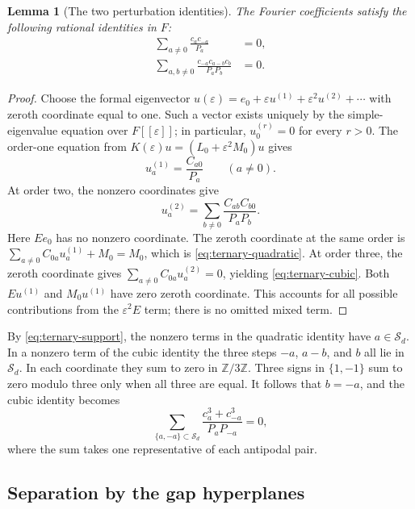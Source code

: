 \documentclass[11pt,a4paper]{article}
\newtheorem{lemma}{Lemma}[section]
\theoremstyle{definition}
\theoremstyle{remark}\newtheorem{remark}[lemma]{Remark}
\newcommand{\Z}{\mathbb Z}\newcommand{\Q}{\mathbb Q}
\begin{document}
\begin{lemma}[The two perturbation identities]\label{lem:ternary-identities}
The Fourier coefficients satisfy the following rational identities in $F$:
\begin{align}
 \sum_{a\ne0}\frac{c_ac_{-a}}{P_a}&=0,
       \label{eq:ternary-quadratic}\\
 \sum_{a,b\ne0}
   \frac{c_{-a}c_{a-b}c_b}{P_aP_b}&=0.
       \label{eq:ternary-cubic}
\end{align}
\end{lemma}
\begin{proof}
Choose the formal eigenvector
$u(\varepsilon)=e_0+\varepsilon u^{(1)}+\varepsilon^2u^{(2)}+\cdots$
with zeroth coordinate equal to one. Such a vector exists uniquely by
the simple-eigenvalue equation over $F[[\varepsilon]]$; in particular,
$u_0^{(r)}=0$ for every $r>0$.
The order-one equation from
$K(\varepsilon)u=(L_0+\varepsilon^2M_0)u$ gives
\[
 u_a^{(1)}=\frac{C_{a0}}{P_a}\qquad(a\ne0).
\]
At order two, the nonzero coordinates give
\[
 u_a^{(2)}=
   \sum_{b\ne0}\frac{C_{ab}C_{b0}}{P_aP_b}.
\]
Here $Ee_0$ has no nonzero coordinate. The zeroth coordinate at the same
order is
$\sum_{a\ne0}C_{0a}u_a^{(1)}+M_0=M_0$, which is
\eqref{eq:ternary-quadratic}. At order three, the zeroth coordinate gives
$\sum_{a\ne0}C_{0a}u_a^{(2)}=0$, yielding
\eqref{eq:ternary-cubic}. Both $Eu^{(1)}$ and $M_0u^{(1)}$ have zero
zeroth coordinate. This accounts for all possible contributions from the
$\varepsilon^2E$ term; there is no omitted mixed term.
\end{proof}

By \eqref{eq:ternary-support}, the nonzero terms in the quadratic identity
have $a\in\mathcal S_d$. In a nonzero term of the cubic identity the three
steps $-a$, $a-b$, and $b$ all lie in $\mathcal S_d$. In each coordinate
they sum to zero in $\Z/3\Z$. Three signs in $\{1,-1\}$ sum to zero
modulo three only when all three are equal. It follows that $b=-a$, and
the cubic identity becomes
\begin{equation}\label{eq:ternary-cubic-pairs}
 \sum_{\{a,-a\}\subset\mathcal S_d}
     \frac{c_a^3+c_{-a}^3}{P_aP_{-a}}=0,
\end{equation}
where the sum takes one representative of each antipodal pair.

\subsection{Separation by the gap hyperplanes}
\end{document}
